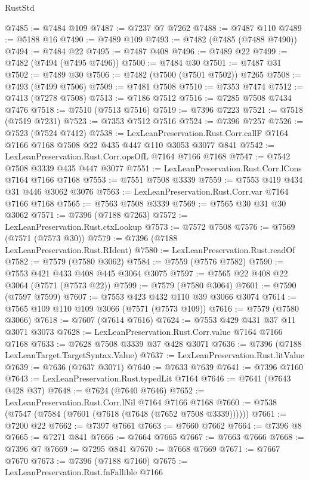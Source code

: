 \begin{lexlean}{RustStd}
\begin{coremodule}
{\begin{coremodule}
{{{{{{{{{{{{{{{{{{{{{{{{{{{{{{{{@7485 := @7484 @109
@7487 := @7237 @7 @7262
@7488 := @7487 @110
@7489 := @5188 @16
@7490 := @7489 @109
@7493 := @7482 (@7485 (@7488 @7490))
@7494 := @7484 @22
@7495 := @7487 @408
@7496 := @7489 @22
@7499 := @7482 (@7494 (@7495 @7496))
@7500 := @7484 @30
@7501 := @7487 @31
@7502 := @7489 @30
@7506 := @7482 (@7500 (@7501 @7502)) @7265
@7508 := @7493 (@7499 @7506)
@7509 := @7481 @7508
@7510 := @7353 @7474
@7512 := @7413 (@7278 @7508)
@7513 := @7186 @7512
@7516 := @7285 @7508 @7434 @7476
@7518 := @7510 (@7513 @7516)
@7519 := @7396 @7223
@7521 := @7518 (@7519 @7231)
@7523 := @7353 @7512 @7516
@7524 := @7396 @7257
@7526 := @7523 (@7524 @7412)
@7538 := LexLeanPreservation.Rust.Corr.callF
    @7164
    @7166
    @7168
    @7508
    @22
    @435
    @447
    @110
    @3053
    @3077
    @841
@7542 := LexLeanPreservation.Rust.Corr.opsOfL @7164 @7166 @7168
@7547 := @7542 @7508 @3339 @435 @447 @3077
@7551 := LexLeanPreservation.Rust.Corr.lCons @7164 @7166 @7168
@7553 := @7551 @7508 @3339
@7559 := @7553 @419 @434 @31 @446 @3062 @3076
@7563 := LexLeanPreservation.Rust.Corr.var @7164 @7166 @7168
@7565 := @7563 @7508 @3339
@7569 := @7565 @30 @31 @30 @3062
@7571 := @7396 (@7188 @7263)
@7572 := LexLeanPreservation.Rust.ctxLookup
@7573 := @7572 @7508
@7576 := @7569 (@7571 (@7573 @30))
@7579 := @7396 (@7188 LexLeanPreservation.Rust.RIdent)
@7580 := LexLeanPreservation.Rust.readOf
@7582 := @7579 (@7580 @3062)
@7584 := @7559 (@7576 @7582)
@7590 := @7553 @421 @433 @408 @445 @3064 @3075
@7597 := @7565 @22 @408 @22 @3064 (@7571 (@7573 @22))
@7599 := @7579 (@7580 @3064)
@7601 := @7590 (@7597 @7599)
@7607 := @7553 @423 @432 @110 @39 @3066 @3074
@7614 := @7565 @109 @110 @109 @3066 (@7571 (@7573 @109))
@7616 := @7579 (@7580 @3066)
@7618 := @7607 (@7614 @7616)
@7624 := @7553 @429 @431 @37 @11 @3071 @3073
@7628 := LexLeanPreservation.Rust.Corr.value @7164 @7166 @7168
@7633 := @7628 @7508 @3339 @37 @428 @3071
@7636 := @7396 (@7188 LexLeanTarget.TargetSyntax.Value)
@7637 := LexLeanPreservation.Rust.litValue
@7639 := @7636 (@7637 @3071)
@7640 := @7633 @7639
@7641 := @7396 @7160
@7643 := LexLeanPreservation.Rust.typedLit @7164
@7646 := @7641 (@7643 @428 @37)
@7648 := @7624 (@7640 @7646)
@7652 := LexLeanPreservation.Rust.Corr.lNil @7164 @7166 @7168
@7660 := @7538 (@7547 (@7584 (@7601 (@7618 (@7648 (@7652 @7508 @3339))))))
@7661 := @7200 @22
@7662 := @7397 @7661
@7663 := @7660 @7662
@7664 := @7396 @8
@7665 := @7271 @841
@7666 := @7664 @7665
@7667 := @7663 @7666
@7668 := @7396 @7
@7669 := @7295 @841
@7670 := @7668 @7669
@7671 := @7667 @7670
@7673 := @7396 (@7188 @7160)
@7675 := LexLeanPreservation.Rust.fnFallible @7166
}}}}}}}}}}}}}}}}}}}}}}}}}}}}}}}}
\end{coremodule}}
\end{coremodule}
\end{lexlean}
